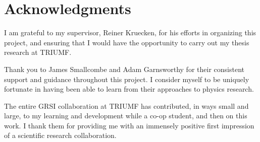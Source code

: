 
\chapter{Acknowledgments}

\noindent I am grateful to my supervisor, Reiner Kruecken, for his efforts in organizing this project, and ensuring that I would have the opportunity to carry out my thesis research at TRIUMF. \newline

\noindent Thank you to James Smallcombe and Adam Garnsworthy for their consistent support and guidance throughout this project. I consider myself to be uniquely fortunate in having been able to learn from their approaches to physics research. \newline

\noindent The entire GRSI collaboration at TRIUMF has contributed, in ways small and large, to my learning and development while a co-op student, and then on this work. I thank them for providing me with an immensely positive first impression of a scientific research collaboration.
